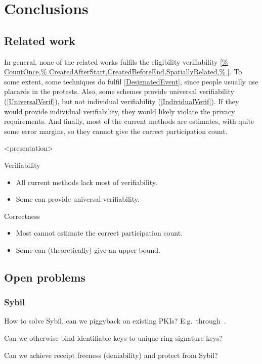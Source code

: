 \mode*
\section{Conclusions}

\subsection<presentation>{Related work}

In general, none of the related works fulfils the eligibility verifiability 
\cref{%
  CountOnce,%
  CreatedAfterStart,CreatedBeforeEnd,SpatiallyRelated,%
}.
To some extent, some techniques do fulfil \cref{DesignatedEvent}, since people 
usually use placards in the protests.
Also, some schemes provide universal verifiability (\cref{UniversalVerif}), but 
not individual verifiability (\cref{IndividualVerif}).
If they would provide individual verifiability, they would likely violate the 
privacy requirements.
And finally, most of the current methods are estimates, with quite some error 
margins, so they cannot give the correct participation count.

\begin{frame}<presentation>
  \begin{block}{Verifiability}
    \begin{itemize}
      \item All current methods lack most of verifiability.
      \item Some can provide universal verifiability.
    \end{itemize}
  \end{block}

  \pause{}

  \begin{block}{Correctness}
    \begin{itemize}
      \item Most cannot estimate the correct participation count.
      \item Some can (theoretically) give an upper bound.
    \end{itemize}
  \end{block}
\end{frame}

\subsection{Open problems}

\begin{frame}
  \frametitle{Sybil}
  \begin{question}
    How to solve Sybil, can we piggyback on existing \acp{PKI}?
    E.g.\ through~\cite{Cinderella}.
  \end{question}

  \begin{question}
    Can we otherwise bind identifiable keys to unique ring signature keys?
  \end{question}

  \begin{question}
    Can we achieve receipt freeness (deniability) and protect from Sybil?
  \end{question}
\end{frame}

